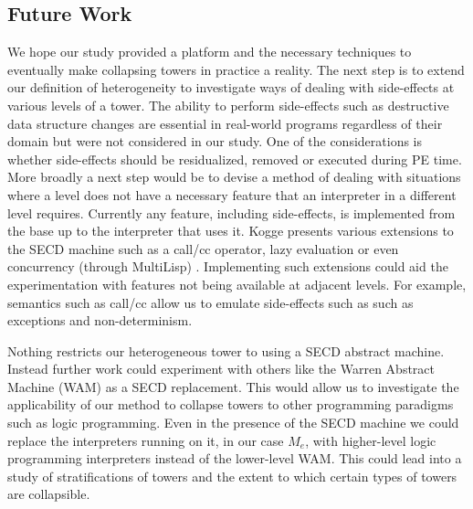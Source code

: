\documentclass[a4paper,12pt,twoside,openright]{report}
\theoremstyle{definition}
\newcommand{\mslang}{$\lambda_{\uparrow\downarrow}$}
\newcommand{\mevl}{$M_{e}$}
\begin{document}
\subsection{Future Work}\label{subsec:future}
We hope our study provided a platform and the necessary techniques to eventually make collapsing towers in practice a reality. The next step is to extend our definition of heterogeneity to investigate ways of dealing with side-effects at various levels of a tower. The ability to perform side-effects such as destructive data structure changes are essential in real-world programs regardless of their domain but were not considered in our study.
One of the considerations is whether side-effects should be residualized, removed or executed during PE time. More broadly a next step would be to devise a method of dealing with situations where a level does not have a necessary feature that an interpreter in a different level requires. Currently any feature, including side-effects, is implemented from the base up to the interpreter that uses it. Kogge presents various extensions to the SECD machine such as a call/cc operator, lazy evaluation or even concurrency (through MultiLisp) \cite{kogge1990architecture}. Implementing such extensions could aid the experimentation with features not being available at adjacent levels. For example, semantics such as call/cc allow us to emulate side-effects such as such as exceptions and non-determinism.

Nothing restricts our heterogeneous tower to using a SECD abstract machine. Instead further work could experiment with others like the Warren Abstract Machine (WAM) \cite{warren1983abstract} as a SECD replacement. This would allow us to investigate the applicability of our method to collapse towers to other programming paradigms such as logic programming. Even in the presence of the SECD machine we could replace the interpreters running on it, in our case \mevl, with higher-level logic programming interpreters instead of the lower-level WAM. This could lead into a study of stratifications of towers and the extent to which certain types of towers are collapsible.
\end{document}
